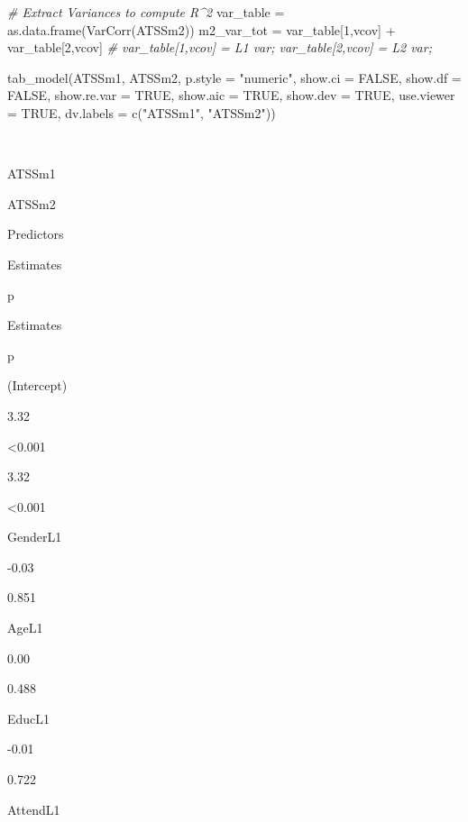 \documentclass[
  11pt,
]{book}
\newenvironment{Shaded}{\begin{snugshade}}{\end{snugshade}}
\newcommand{\AttributeTok}[1]{\textcolor[rgb]{0.77,0.63,0.00}{#1}}
\newcommand{\CommentTok}[1]{\textcolor[rgb]{0.56,0.35,0.01}{\textit{#1}}}
\newcommand{\ConstantTok}[1]{\textcolor[rgb]{0.00,0.00,0.00}{#1}}
\newcommand{\DecValTok}[1]{\textcolor[rgb]{0.00,0.00,0.81}{#1}}
\newcommand{\FunctionTok}[1]{\textcolor[rgb]{0.00,0.00,0.00}{#1}}
\newcommand{\NormalTok}[1]{#1}
\newcommand{\OtherTok}[1]{\textcolor[rgb]{0.56,0.35,0.01}{#1}}
\newcommand{\SpecialCharTok}[1]{\textcolor[rgb]{0.00,0.00,0.00}{#1}}
\newcommand{\StringTok}[1]{\textcolor[rgb]{0.31,0.60,0.02}{#1}}
\begin{document}
\begin{Shaded}
\begin{Highlighting}[]
\CommentTok{\# Extract Variances to compute R\^{}2}
\NormalTok{  var\_table }\OtherTok{=} \FunctionTok{as.data.frame}\NormalTok{(}\FunctionTok{VarCorr}\NormalTok{(ATSSm2))}
\NormalTok{  m2\_var\_tot }\OtherTok{=}\NormalTok{ var\_table[}\DecValTok{1}\NormalTok{,}\StringTok{\textquotesingle{}vcov\textquotesingle{}}\NormalTok{] }\SpecialCharTok{+}\NormalTok{ var\_table[}\DecValTok{2}\NormalTok{,}\StringTok{\textquotesingle{}vcov\textquotesingle{}}\NormalTok{] }\CommentTok{\# var\_table[1,\textquotesingle{}vcov\textquotesingle{}] = L1 var; var\_table[2,\textquotesingle{}vcov\textquotesingle{}] = L2 var; }

\FunctionTok{tab\_model}\NormalTok{(ATSSm1, ATSSm2, }\AttributeTok{p.style =} \StringTok{"numeric"}\NormalTok{, }\AttributeTok{show.ci =} \ConstantTok{FALSE}\NormalTok{, }\AttributeTok{show.df =} \ConstantTok{FALSE}\NormalTok{, }\AttributeTok{show.re.var =} \ConstantTok{TRUE}\NormalTok{, }\AttributeTok{show.aic =} \ConstantTok{TRUE}\NormalTok{, }\AttributeTok{show.dev =} \ConstantTok{TRUE}\NormalTok{, }\AttributeTok{use.viewer =} \ConstantTok{TRUE}\NormalTok{, }\AttributeTok{dv.labels =} \FunctionTok{c}\NormalTok{(}\StringTok{"ATSSm1"}\NormalTok{, }\StringTok{"ATSSm2"}\NormalTok{))}
\end{Highlighting}
\end{Shaded}

~

ATSSm1

ATSSm2

Predictors

Estimates

p

Estimates

p

(Intercept)

3.32

\textless0.001

3.32

\textless0.001

GenderL1

-0.03

0.851

AgeL1

0.00

0.488

EducL1

-0.01

0.722

AttendL1
\end{document}
